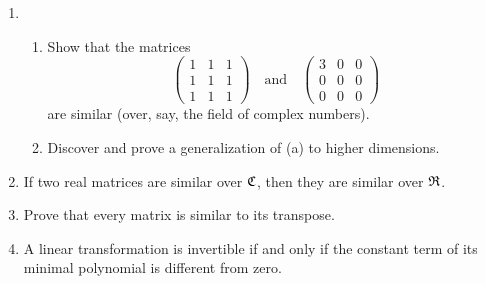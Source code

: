 {\begin{enumerate}[wide]
    \item\begin{enumerate}[label=(\alph*), wide, nosep]
        \item Show that the matrices
        \begin{equation*}
            \begin{pmatrix}
                1 & 1& 1 \\ 1 & 1 & 1 \\ 1 & 1 & 1
            \end{pmatrix} \quad \text{and} \quad
            \begin{pmatrix}
                3 & 0 & 0 \\ 0 & 0 & 0 \\ 0 & 0 & 0
            \end{pmatrix}
        \end{equation*}
        are similar (over, say, the field of complex numbers).
        \item Discover and prove a generalization of (a) to higher dimensions.
    \end{enumerate}

    \item If two real matrices are similar over \(\mathfrak{C}\), then they are similar over \(\mathfrak{R}\).
    
    \item Prove that every matrix is similar to its transpose.

    \item A linear transformation is invertible if and only if the constant term
    of its minimal polynomial is different from zero.
\end{enumerate}

}